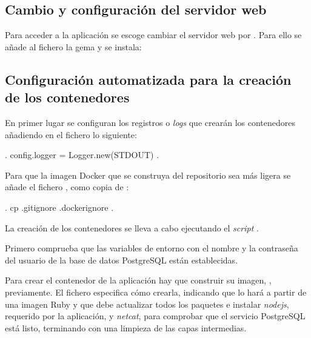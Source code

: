 \subsection{Cambio y configuración del servidor web}

Para acceder a la aplicación se escoge cambiar el servidor web  por . Para ello se añade al fichero  la gema  y se instala: 


\subsection{Configuración automatizada para la creación de los contenedores}

En primer lugar se configuran los registros o \textit{logs} que crearán los contenedores añadiendo en el fichero  lo siguiente:

\begin{codelisting}
\label{code:application.rb}
\begin{code}
.
config.logger = Logger.new(STDOUT)
.
\end{code}
\end{codelisting}

Para que la imagen Docker que se construya del repositorio sea más ligera se añade el fichero , como copia de :

\begin{codelisting}
\label{code:.dockerignore}
\begin{code}
.
cp .gitignore .dockerignore
.
\end{code}
\end{codelisting}

La creación de los contenedores se lleva a cabo ejecutando el \textit{script} .

Primero comprueba que las variables de entorno con el nombre y la contraseña del usuario de la base de datos PostgreSQL están establecidas.

Para crear el contenedor de la aplicación hay que construir su imagen, , previamente. El fichero  especifica cómo crearla, indicando que lo hará a partir de una imagen Ruby y que debe actualizar todos los paquetes e instalar \textit{nodejs}, requerido por la aplicación, y \textit{netcat}, para comprobar que el servicio PostgreSQL está listo, terminando con una limpieza de las capas intermedias. 

